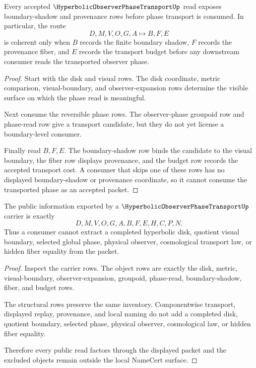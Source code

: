 \begin{theorem}
\label{thm:hyperbolic-observer-phase-transport-boundary-coherence}
Every accepted $\HyperbolicObserverPhaseTransportUp$ read exposes boundary-shadow and provenance rows before phase transport is consumed. In particular, the route
$$
D,M,V,O,G,A \longmapsto B,F,E
$$
is coherent only when $B$ records the finite boundary shadow, $F$ records the provenance fiber, and $E$ records the transport budget before any downstream consumer reads the transported observer phase.
\end{theorem}
\begin{proof}
Start with the disk and visual rows. The disk coordinate, metric comparison, visual-boundary, and observer-expansion rows determine the visible surface on which the phase read is meaningful.

Next consume the reversible phase rows. The observer-phase groupoid row and phase-read row give a transport candidate, but they do not yet license a boundary-level consumer.

Finally read $B,F,E$. The boundary-shadow row binds the candidate to the visual boundary, the fiber row displays provenance, and the budget row records the accepted transport cost. A consumer that skips one of these rows has no displayed boundary-shadow or provenance coordinate, so it cannot consume the transported phase as an accepted packet.
\end{proof}

\begin{theorem}
\label{thm:hyperbolic-observer-phase-transport-nonescape}
The public information exported by a $\HyperbolicObserverPhaseTransportUp$ carrier is exactly
$$
D,M,V,O,G,A,B,F,E,H,C,P,N .
$$
Thus a consumer cannot extract a completed hyperbolic disk, quotient visual boundary, selected global phase, physical observer, cosmological transport law, or hidden fiber equality from the packet.
\end{theorem}
\begin{proof}
Inspect the carrier rows. The object rows are exactly the disk, metric, visual-boundary, observer-expansion, groupoid, phase-read, boundary-shadow, fiber, and budget rows.

The structural rows preserve the same inventory. Componentwise transport, displayed replay, provenance, and local naming do not add a completed disk, quotient boundary, selected phase, physical observer, cosmological law, or hidden fiber equality.

Therefore every public read factors through the displayed packet and the excluded objects remain outside the local NameCert surface.
\end{proof}

